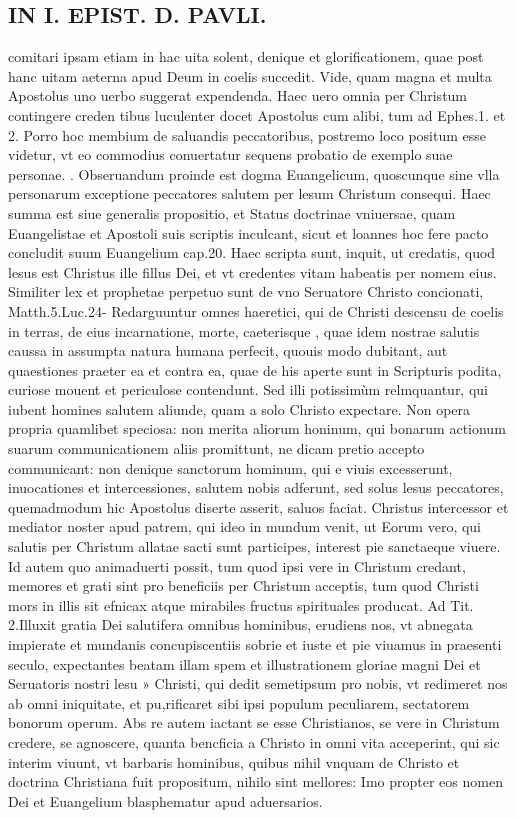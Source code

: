\documentclass{article}
\begin{document}
\begin{pages}
\section*{IN I. EPIST. D. PAVLI. }
\marginpar{[ p.51 ]}\pstart comitari ipsam etiam in hac uita solent, denique et glorificationem, quae post hanc uitam aeterna apud Deum in coelis succedit. Vide, quam magna et multa Apostolus uno uerbo suggerat expendenda. Haec uero omnia per Christum contingere creden tibus luculenter docet Apostolus cum alibi, tum ad Ephes.1. et 2. Porro hoc membium de saluandis peccatoribus, postremo loco positum esse videtur, vt eo commodius conuertatur sequens probatio de exemplo suae personae.  \pend{}. Obseruandum proinde est dogma Euangelicum, quoscunque  sine vlla personarum exceptione peccatores salutem per lesum Christum consequi. Haec summa est siue generalis propositio, et Status doctrinae vniuersae, quam Euangelistae et Apostoli suis scriptis inculcant, sicut et loannes hoc fere pacto concludit suum Euangelium cap.20. Haec scripta sunt, inquit, ut credatis, quod lesus est Christus ille fillus Dei, et vt credentes vitam habeatis per nomem eius. Similiter lex et prophetae perpetuo sunt de vno Seruatore Christo concionati, Matth.5.Luc.24-  \pend{} Redarguuntur omnes haeretici, qui de Christi descensu de coelis in terras, de eius incarnatione, morte, caeterisque , quae idem nostrae salutis caussa in assumpta natura humana perfecit, quouis modo dubitant, aut quaestiones praeter ea et contra ea, quae de his aperte sunt in Scripturis podita, curiose mouent et periculose contendunt. Sed illi potissimùm relmquantur, qui iubent homines salutem aliunde, quam a solo Christo expectare. Non opera propria quamlibet speciosa: non merita aliorum honinum, qui bonarum actionum suarum communicationem aliis promittunt, ne dicam pretio accepto communicant: non denique sanctorum hominum, qui e viuis excesserunt, inuocationes et intercessiones, salutem nobis adferunt, sed solus lesus peccatores, quemadmodum hic Apostolus diserte asserit, saluos faciat. Christus intercessor et mediator noster apud patrem, qui ideo in mundum venit, ut  \pend\pstart Eorum vero, qui salutis per Christum allatae sacti sunt participes, interest pie sanctaeque  viuere. Id autem quo animaduerti possit, tum quod ipsi vere in Christum credant, memores et grati sint pro beneficiis per Christum acceptis, tum quod Christi mors in illis sit efnicax atque mirabiles fructus spirituales producat. Ad Tit. 2.Illuxit gratia Dei salutifera omnibus hominibus, erudiens nos, vt abnegata impierate et mundanis concupiscentiis sobrie et iuste et pie viuamus in praesenti seculo, expectantes beatam illam spem et illustrationem gloriae magni Dei et Seruatoris nostri lesu » Christi, qui dedit semetipsum pro nobis, vt redimeret nos ab omni iniquitate, et pu,rificaret sibi ipsi populum peculiarem, sectatorem bonorum operum.  \pend\pstart Abs re autem iactant se esse Christianos, se vere in Christum credere, se agnoscere, quanta bencficia a Christo in omni vita acceperint, qui sic interim viuunt, vt barbaris hominibus, quibus nihil vnquam de Christo et doctrina Christiana fuit propositum, nihilo sint mellores: Imo propter eos nomen Dei et Euangelium blasphematur apud aduersarios.  
\end{pages}
\end{document}
